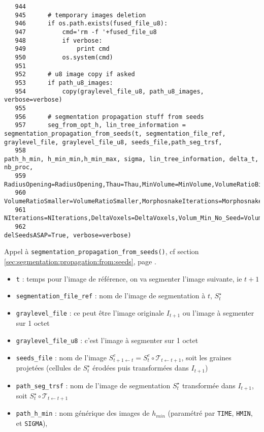 \documentclass{article}
\def \mycolor {red}
\begin{document}
\begin{verbatim}
   944	
   945	    # temporary images deletion
   946	    if os.path.exists(fused_file_u8):
   947	        cmd='rm -f '+fused_file_u8
   948	        if verbose:
   949	            print cmd
   950	        os.system(cmd)
   951	
   952	    # u8 image copy if asked
   953	    if path_u8_images:
   954	        copy(graylevel_file_u8, path_u8_images, verbose=verbose)
   955	
   956	    # segmentation propagation stuff from seeds
   957	    seg_from_opt_h, lin_tree_information = segmentation_propagation_from_seeds(t, segmentation_file_ref, graylevel_file, graylevel_file_u8, seeds_file,path_seg_trsf, 
   958	                                                                               path_h_min, h_min_min,h_min_max, sigma, lin_tree_information, delta_t, nb_proc,
   959	                                                                               RadiusOpening=RadiusOpening,Thau=Thau,MinVolume=MinVolume,VolumeRatioBigger=VolumeRatioBigger,
   960	                                                                               VolumeRatioSmaller=VolumeRatioSmaller,MorphosnakeIterations=MorphosnakeIterations,
   961	                                                                               NIterations=NIterations,DeltaVoxels=DeltaVoxels,Volum_Min_No_Seed=Volum_Min_No_Seed, 
   962	                                                                               delSeedsASAP=True, verbose=verbose)
\end{verbatim} 
\color{\mycolor}
Appel \`a \texttt{segmentation\_propagation\_from\_seeds()}, cf section \ref{sec:segmentation:propagation:from:seeds}, page \pageref{sec:segmentation:propagation:from:seeds}.
\begin{itemize}
\itemsep -1ex
\item \verb|t| : temps pour l'image de r\'ef\'erence, on va segmenter l'image suivante, ie $t+1$
\item \verb|segmentation_file_ref| : nom de l'image de segmentation \`a $t$, $S^{\star}_t$
\item \verb|graylevel_file| : ce peut \^etre l'image originale $I_{t+1}$ ou  l'image \`a segmenter sur 1 octet
\item \verb|graylevel_file_u8| : c'est l'image \`a segmenter sur 1 octet
\item \verb|seeds_file| : nom de l'image $S^e_{t+1 \leftarrow t} = S^e_t \circ \mathcal{T}_{t \leftarrow t+1}$, soit les graines projet\'ees (cellules de $S^{\star}_t$ \'erod\'ees puis transform\'ees dans $I_{t+1}$)
\item \verb|path_seg_trsf| : nom de l'image de segmentation $S^{\star}_t$ transform\'ee dans $I_{t+1}$, soit
$S^{\star}_t \circ \mathcal{T}_{t \leftarrow t+1}$
\item \verb|path_h_min| : nom g\'en\'erique des images de $h_{min}$ (param\'etr\'e par \verb|TIME|, \verb|HMIN|, et \verb|SIGMA|),
\end{itemize}
\end{document}

